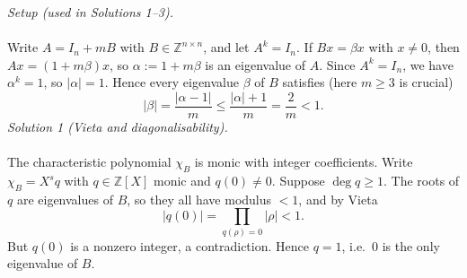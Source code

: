 \begin{solution}
    \textit{Setup (used in Solutions 1--3).}
    \\\\
    Write \( A = I_n + mB \) with \( B \in \mathbb{Z}^{n \times n} \), and let \( A^k = I_n \). If \( Bx = \beta x \) with \( x \neq 0 \), then \( Ax = \left(1 + m\beta\right)x \), so \( \alpha := 1 + m\beta \) is an eigenvalue of \( A \). Since \( A^k = I_n \), we have \( \alpha^k = 1 \), so \( |\alpha| = 1 \). Hence every eigenvalue \( \beta \) of \( B \) satisfies (here \( m \geq 3 \) is crucial)
    \[
        |\beta| = \frac{|\alpha - 1|}{m} \leq \frac{|\alpha| + 1}{m} = \frac{2}{m} < 1.
    \]
    \textit{Solution 1 (Vieta and diagonalisability).}
    \\\\
    The characteristic polynomial \( \chi_B \) is monic with integer coefficients. Write \( \chi_B = X^s q \) with \( q \in \mathbb{Z}\left[X\right] \) monic and \( q\left(0\right) \neq 0 \). Suppose \( \deg q \geq 1 \). The roots of \( q \) are eigenvalues of \( B \), so they all have modulus \( < 1 \), and by Vieta
    \[
        |q\left(0\right)| = \prod_{q\left(\rho\right) = 0} |\rho| < 1.
    \]
    But \( q\left(0\right) \) is a nonzero integer, a contradiction. Hence \( q = 1 \), i.e.\ \( 0 \) is the only eigenvalue of \( B \).


\end{solution}
